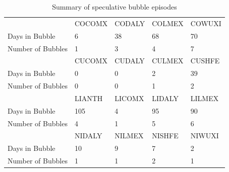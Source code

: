 \begin{table}

\caption{\label{tab:bubble_summary_up}Summary of speculative bubble episodes}
\centering
\begin{tabular}[t]{lllll}
\toprule
 & COCOMX & CODALY & COLMEX & COWUXI\\
Days in Bubble & 6 & 38 & 68 & 70\\
Number of Bubbles & 1 & 3 & 4 & 7\\
\addlinespace
 & CUCOMX & CUDALY & CULMEX & CUSHFE\\
Days in Bubble & 0 & 0 & 2 & 39\\
Number of Bubbles & 0 & 0 & 1 & 2\\
\addlinespace
 & LIANTH & LICOMX & LIDALY & LILMEX\\
Days in Bubble & 105 & 4 & 95 & 90\\
Number of Bubbles & 4 & 1 & 5 & 6\\
\addlinespace
 & NIDALY & NILMEX & NISHFE & NIWUXI\\
Days in Bubble & 10 & 9 & 7 & 2\\
Number of Bubbles & 1 & 1 & 2 & 1\\
\bottomrule
\end{tabular}
\end{table}
